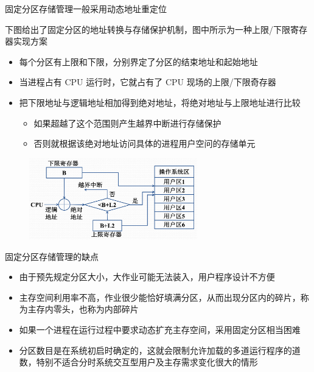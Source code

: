 \documentclass[cs4size,a4paper,10pt]{ctexart}
\begin{document}
		固定分区存储管理一般采用动态地址重定位

		下图给出了固定分区的地址转换与存储保护机制，图中所示为一种上限/下限寄存器实现方案
		\begin{itemize}
			\item 每个分区有上限和下限，分别界定了分区的结束地址和起始地址
			\item 当进程占有 CPU 运行时，它就占有了 CPU 现场的上限/下限奇存器
			\item 把下限地址与逻辑地址相加得到绝对地址，将绝对地址与上限地址进行比较
			\begin{itemize}
				\item 如果超越了这个范围则产生越界中断进行存储保护
				\item 否则就根据该绝对地址访问具体的进程用户空问的存储单元
			\end{itemize}
		\end{itemize}
		\begin{figure}[H]
			\centering
			\includegraphics[width=0.65\textwidth]{img/3.2.2}
		\end{figure}

		固定分区存储管理的缺点
		\begin{itemize}
			\item 由于预先规定分区大小，大作业可能无法装入，用户程序设计不方便
			\item 主存空间利用率不高，作业很少能恰好填满分区，从而出现分区内的碎片，称为主存内零头，也称为内部碎片
			\item 如果一个进程在运行过程中要求动态扩充主存空间，采用固定分区相当困难
			\item 分区数目是在系统初启时确定的，这就会限制允许加载的多道运行程序的道数，特别不适合分时系统交互型用户及主存需求变化很大的情形
		\end{itemize}
\end{document}
